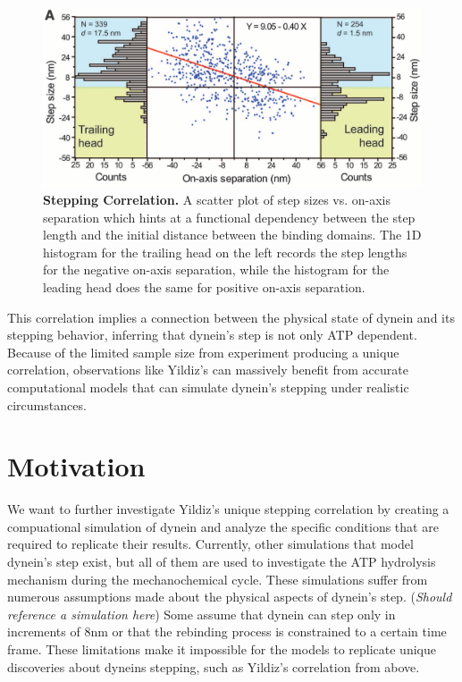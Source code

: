 \begin{figure}[H]
	\centering
	\includegraphics[width=1\columnwidth]{Figures/Yildiz_stepping.png}
	\caption[Stepping Correlation]{\textbf{Stepping Correlation.} A scatter plot of step sizes vs. on-axis separation which hints at a functional dependency between the step  length and the initial distance between the binding domains. The 1D histogram for the trailing head on the left records the step lengths for the negative on-axis separation, while the histogram for the leading head does the same for positive on-axis separation. \cite{Dewitt2012} }
	\label{fig:YildizCorrelation}
\end{figure}

This correlation implies a connection between the physical state of dynein and its stepping behavior, inferring that dynein's step is not only ATP dependent. Because of the limited sample size from experiment producing a unique correlation, observations like Yildiz's can massively benefit from accurate computational models that can simulate dynein's stepping under realistic circumstances.


\section{Motivation}

We want to further investigate Yildiz's unique stepping correlation by creating a compuational simulation of dynein and analyze the specific conditions that are required to replicate their results. Currently, other simulations that model dynein's step exist, but all of them are used to investigate the ATP hydrolysis mechanism during the mechanochemical cycle. These simulations suffer from numerous assumptions made about the physical aspects of dynein's step. (\textit{Should reference a simulation here}) Some assume that dynein can step only in increments of 8nm or that the rebinding process is constrained to a certain time frame. These limitations make it impossible for the models to replicate unique discoveries about dyneins stepping, such as Yildiz's correlation from above.

